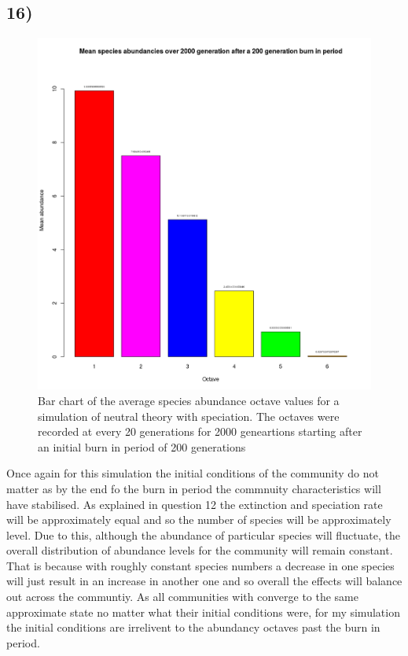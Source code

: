 \documentclass[11pt]{article}
\begin{document}
\subsection*{16)}
\begin{figure}[H]
\begin{center}
\includegraphics[scale=0.35]{../Results/Plots/Mean_abundancy_octaves.png}
\caption{Bar chart of the average species abundance octave values for a simulation of neutral theory with speciation. The octaves were recorded at every 20 generations for 2000 geneartions starting after an initial burn in period of 200 generations}
\end{center}
\end{figure} 
Once again for this simulation the initial conditions of the community do not matter as by the end fo the burn in period the commnuity characteristics will have stabilised. As explained in question 12 the extinction and speciation rate will be approximately equal and so the number of species will be approximately level. Due to this, although the abundance of particular species will fluctuate, the overall distribution of abundance levels for the community will remain constant. That is because with roughly constant species numbers a decrease in one species will just result in an increase in another one and so overall the effects will balance out across the communtiy. As all communities with converge to the same approximate state no matter what their initial conditions were, for my simulation the initial conditions are irrelivent to the abundancy octaves past the burn in period. 
\end{document}
